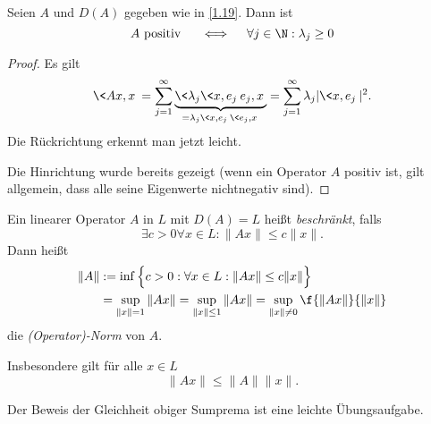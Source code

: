 \begin{nt} \label{1.22}
	Seien $A$ und $D(A)$ gegeben wie in \ref{1.19}.
	Dann ist
	\[
		A \text{ positiv }  \quad\iff\quad \forall j\in \N : \lambda_j \ge 0
	\]
	\begin{proof}
		Es gilt
		\begin{align*}
			\<Ax, x \> 
			= \sum_{j=1}^\infty \underbrace{\<\lambda_j \<x,e_j\> e_j, x\>}_{= \lambda_j\<x,e_j\> \<e_j,x\>}
			= \sum_{j=1}^\infty \lambda_j |\<x,e_j\>|^2.
		\end{align*}
		Die Rückrichtung erkennt man jetzt leicht.

		Die Hinrichtung wurde bereits gezeigt (wenn ein Operator $A$ positiv ist, gilt allgemein, dass alle seine Eigenwerte nichtnegativ sind).
	\end{proof}
\end{nt}

\begin{df} \label{1.23}
	Ein linearer Operator $A$ in $L$ mit $D(A) = L$ heißt \emph{beschränkt}, falls
	\[
		\exists c > 0 \forall x \in L : \|Ax\| \le c\|x\|.
	\]
	Dann heißt
	\begin{align*}
		\|A\| &:= \inf \Big\{ c > 0 : \forall x \in L : \|Ax\| \le c\|x\| \Big\} \\
		&= \sup_{\|x\|=1} \|Ax\| = \sup_{\|x\|\le 1} \|Ax\| = \sup_{\|x\|\neq 0} \f{\|Ax\|}{\|x\|}
	\end{align*}
	die \emph{(Operator)-Norm} von $A$.

	Insbesondere gilt für alle $ x\in L $
	\[
		\|Ax\| \le \|A\| \|x\|.
	\]
	\begin{note}
		Der Beweis der Gleichheit obiger Sumprema ist eine leichte Übungsaufgabe.
	\end{note}
\end{df}

